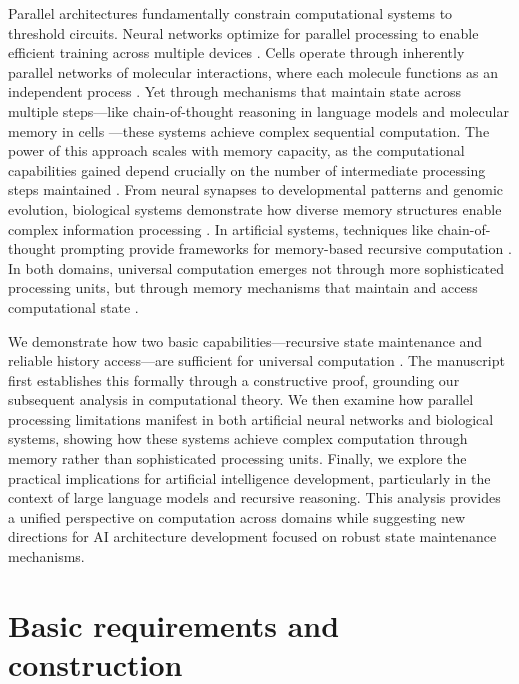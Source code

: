 \documentclass[12pt]{article}
\begin{document}
Parallel architectures fundamentally constrain computational systems to threshold circuits.
Neural networks optimize for parallel processing to enable efficient training across multiple devices \cite{merrill2023parallelism,merrill2024}.
Cells operate through inherently parallel networks of molecular interactions, where each molecule functions as an independent process \cite{fu2023scgrn}.
Yet through mechanisms that maintain state across multiple steps---like chain-of-thought reasoning in language models \cite{wei2022chain,qiu2024ask} and molecular memory in cells \cite{hoel2020emergence}---these systems achieve complex sequential computation.
The power of this approach scales with memory capacity, as the computational capabilities gained depend crucially on the number of intermediate processing steps maintained \cite{merrill2024}.
From neural synapses to developmental patterns and genomic evolution, biological systems demonstrate how diverse memory structures enable complex information processing \cite{burrill2010making,espinosa2024molecular}.
In artificial systems, techniques like chain-of-thought prompting provide frameworks for memory-based recursive computation \cite{wei2022chain,dickson2024trust,ahn2024recursive}.
In both domains, universal computation emerges not through more sophisticated processing units, but through memory mechanisms that maintain and access computational state \cite{schuurmans2024autoregressive}.

We demonstrate how two basic capabilities---recursive state maintenance and reliable history access---are sufficient for universal computation \cite{bennett1989time,boyle2024memory}.
The manuscript first establishes this formally through a constructive proof, grounding our subsequent analysis in computational theory.
We then examine how parallel processing limitations manifest in both artificial neural networks and biological systems, showing how these systems achieve complex computation through memory rather than sophisticated processing units.
Finally, we explore the practical implications for artificial intelligence development, particularly in the context of large language models and recursive reasoning.
This analysis provides a unified perspective on computation across domains while suggesting new directions for AI architecture development focused on robust state maintenance mechanisms.

\section{Basic requirements and construction}
\end{document}
